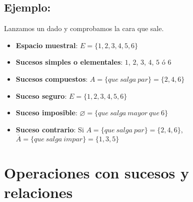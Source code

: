 \subsection{Ejemplo:} Lanzamos un dado y comprobamos la cara que sale.
\begin{itemize}
\item \textbf{Espacio muestral}: $E=\lbrace 1,2,3,4,5,6 \rbrace $
\item \textbf{Sucesos simples o elementales}: $1$, $2$, $3$, $4$, $5$ ó $6$
\item \textbf{Sucesos compuestos}: $A=\lbrace que\ salga\ par\rbrace=\lbrace2,4,6\rbrace$
\item \textbf{Suceso seguro}: $E=\lbrace 1,2,3,4,5,6 \rbrace $
\item \textbf{Suceso imposible}: $\varnothing=\lbrace que\ salga \ mayor \ que \ 6\rbrace$
\item \textbf{Suceso contrario}: Si $A=\lbrace que\ salga\ par\rbrace=\lbrace2,4,6\rbrace$, $\overline{A}=\lbrace que\ salga\ impar\rbrace=\lbrace1,3,5\rbrace$ 
\end{itemize}


\section{Operaciones con sucesos y relaciones}

\def\firstcircle{(0,0) circle (1.5cm)}
\def\secondcircle{(0:2cm) circle (1.5cm)}
\def\espacio{(-2,-2) rectangle (4,2)}



